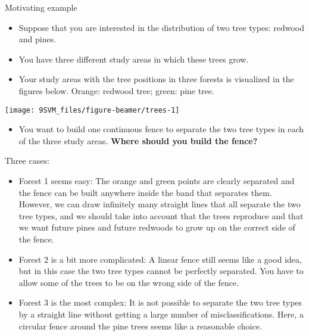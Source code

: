 \documentclass[10pt,ignorenonframetext,]{beamer}
\providecommand{\tightlist}{%
  \setlength{\itemsep}{0pt}\setlength{\parskip}{0pt}}
\begin{document}
\begin{frame}

\begin{block}{Motivating example}

\vspace{2mm}

\begin{itemize}
\item
  Suppose that you are interested in the distribution of two tree types:
  redwood and pines.
\item
  You have three different study areas in which these trees grow.
\item
  Your study areas with the tree positions in three forests is
  visualized in the figures below. Orange: redwood tree; green: pine
  tree.
\end{itemize}

\begin{center}\texttt{[image: 9SVM\_files/figure-beamer/trees-1]} \end{center}

\vspace{0mm}

\begin{itemize}
\tightlist
\item
  You want to build one continuous fence to separate the two tree types
  in each of the three study areas. \textbf{Where should you build the
  fence?}
\end{itemize}

\end{block}

\end{frame}

\begin{frame}

Three cases: \vspace{2mm}

\begin{itemize}
\item
  Forest 1 seems easy: The orange and green points are clearly separated
  and the fence can be built anywhere inside the band that separates
  them. However, we can draw infinitely many straight lines that all
  separate the two tree types, and we should take into account that the
  trees reproduce and that we want future pines and future redwoods to
  grow up on the correct side of the fence.
\item
  Forest 2 is a bit more complicated: A linear fence still seems like a
  good idea, but in this case the two tree types cannot be perfectly
  separated. You have to allow some of the trees to be on the wrong side
  of the fence.
\item
  Forest 3 is the most complex: It is not possible to separate the two
  tree types by a straight line without getting a large number of
  misclassifications. Here, a circular fence around the pine trees seems
  like a reasonable choice.
\end{itemize}

\end{frame}
\end{document}
